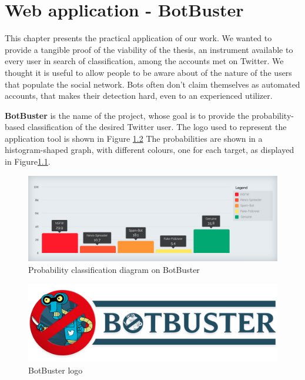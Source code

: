 \chapter{Web application - BotBuster}
\label{capitolo7}
\thispagestyle{empty}
This chapter presents the practical application of our work. We wanted to provide a tangible proof of the viability of the thesis, an instrument available to every user in search of classification, among the accounts met on Twitter.
We thought it is useful to allow people to be aware about of the nature of the users that populate the social network.
Bots often don't claim themselves as automated accounts, that makes their detection hard, even to an experienced utilizer.


\textbf{BotBuster} is the name of the project, whose goal is to provide the probability-based classification of the desired Twitter user.
The logo used to represent the application tool is shown in Figure \ref{fig:botbuster}
The probabilities are shown in a histogram-shaped graph, with different colours, one for each target, as displayed in Figure\ref{fig:histogram}.

\begin{figure}
	\begin{center}
		\includegraphics[width=\columnwidth]{chapter7/figure/histogram.jpg}\par 
	\end{center}
	\caption{Probability classification diagram on BotBuster}
	\label{fig:histogram}
\end{figure}

\begin{figure}
	\begin{center}
		\includegraphics[width=\columnwidth]{chapter7/figure/logo.png}\par 
	\end{center}
	\caption{BotBuster logo}
	\label{fig:botbuster}
\end{figure}


